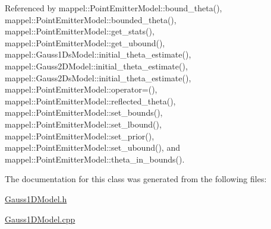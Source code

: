 Referenced by mappel\+::\+Point\+Emitter\+Model\+::bound\+\_\+theta(), mappel\+::\+Point\+Emitter\+Model\+::bounded\+\_\+theta(), mappel\+::\+Point\+Emitter\+Model\+::get\+\_\+stats(), mappel\+::\+Point\+Emitter\+Model\+::get\+\_\+ubound(), mappel\+::\+Gauss1\+Ds\+Model\+::initial\+\_\+theta\+\_\+estimate(), mappel\+::\+Gauss2\+D\+Model\+::initial\+\_\+theta\+\_\+estimate(), mappel\+::\+Gauss2\+Ds\+Model\+::initial\+\_\+theta\+\_\+estimate(), mappel\+::\+Point\+Emitter\+Model\+::operator=(), mappel\+::\+Point\+Emitter\+Model\+::reflected\+\_\+theta(), mappel\+::\+Point\+Emitter\+Model\+::set\+\_\+bounds(), mappel\+::\+Point\+Emitter\+Model\+::set\+\_\+lbound(), mappel\+::\+Point\+Emitter\+Model\+::set\+\_\+prior(), mappel\+::\+Point\+Emitter\+Model\+::set\+\_\+ubound(), and mappel\+::\+Point\+Emitter\+Model\+::theta\+\_\+in\+\_\+bounds().



The documentation for this class was generated from the following files\+:\begin{DoxyCompactItemize}
\item 
\hyperlink{Gauss1DModel_8h}{Gauss1\+D\+Model.\+h}\item 
\hyperlink{Gauss1DModel_8cpp}{Gauss1\+D\+Model.\+cpp}\end{DoxyCompactItemize}
